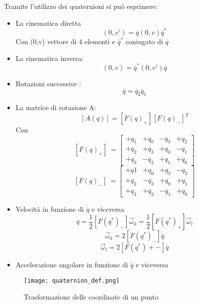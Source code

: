 Tramite l'utilizzo dei quaternioni si può esprimere:
\begin{itemize}
\item La cinematica diretta \begin{equation}
\label{eq:1.3}
(0, v') = \overline{q}(0,v)\overline{q}^*\end{equation}
Con (0,v) vettore di 4 elementi e $\overline{q}^*$ coniugato di $\overline{q}$
\item La cinematica inversa: \begin{equation}
\label{eq:1.4}
(0, v) = \overline{q}^*(0,v')\overline{q}\end{equation}
\item Rotazioni successive :
\begin{equation} 
    \overline{q} = \overline{q}_2 \overline{q}_1 
\end{equation}{}
\item La matrice di rotazione A:
\begin{equation}\left[A(q)\right] = \left[F(q)_+\right]\left[F(q)_-\right]^T \label{eq:1.5}\end{equation}
Con 
\begin{equation} \label{eq:1.6} \left[F(q)_+\right]\ = \begin{bmatrix}
+q_1 & +q_0 & -q_3 & +q_2 \\ +q_2 & +q_3 & +q_0 & -q_1 \\ +q_3 & -q_2 & +q_1 &+q_0\end{bmatrix}
\end{equation}
\begin{equation} \label{eq:1.7} \left[F(q)_-\right]\ = \begin{bmatrix}
+q1 & +q_0 & +q_3 & -q_2 \\ +q_2 & -q_3 & +q_0 & +q_1 \\ +q_3 & +q_2 & -q_1 &+q_0\end{bmatrix}
\end{equation}
\item Velocità in funzione di $ \dot{\overline{q}}$ e viceversa
\begin{equation} \label{eq:1.8}
\dot{\overline{q}} = \frac{1}{2}\left[F(q^*)_-\right]\overrightarrow{\omega}_0 = \frac{1}{2}\left[F(q^*)_+\right]\overrightarrow{\omega}_l\end{equation}
\begin{equation} \label{eq:1.9}
\overrightarrow{\omega}_0 = 2\left[F(q^*)_-\right]\dot{\overline{q}}\end{equation}
\begin{equation} \label{eq:1.10}
\overrightarrow{\omega}_l = 2\left[F(q^*)+-\right]\dot{\overline{q}}\end{equation}
\item Accelerazione angolare in funzione di $\ddot{\overline{q}}$ e viceversa
\end{itemize}
\begin{figure}[h!]
\centering
\texttt{[image: quaternion\_def.png]}
\caption{Trasformazione delle coordinate di un punto}
\label{fig:1.3}
\end{figure}




%
